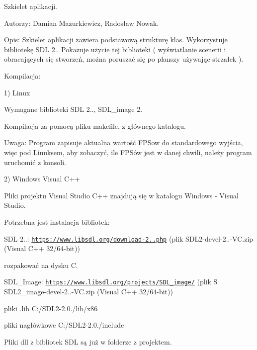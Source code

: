 Szkielet aplikacji.

Autorzy\+: Damian Mazurkiewicz, Radosław Nowak.

Opis\+: Szkielet aplikacji zawiera podstawową strukturę klas. Wykorzystuje bibliotekę S\+D\+L 2.. Pokazuje użycie tej biblioteki ( wyświatlanie scenerii i obracających się stworzeń, można poruszać się po planszy używając strzałek ).

Kompilacja\+:

1) Linux

Wymagane biblioteki S\+D\+L 2.., S\+D\+L\+\_\+image 2.

Kompilacja za pomocą pliku makefile, z głównego katalogu.

Uwaga\+: Program zapisuje aktualna wartość F\+P\+Sow do standardowego wyjścia, więc pod Linuksem, aby zobaczyć, ile F\+P\+Sów jest w danej chwili, należy program uruchomić z konsoli.

2) Windows Visual C++

Pliki projektu Visual Studio C++ znajdują się w katalogu Windows -\/ Visual Studio.

Potrzebna jest instalacja bibliotek\+:

S\+D\+L 2..\+: \href{https://www.libsdl.org/download-2.0.php}{\tt https\+://www.\+libsdl.\+org/download-\/2..\+php} (plik S\+D\+L2-\/devel-\/2..-\/\+V\+C.\+zip (Visual C++ 32/64-\/bit))
\begin{DoxyItemize}
\item rozpakować na dysku C.
\end{DoxyItemize}

S\+D\+L\+\_\+\+Image\+: \href{https://www.libsdl.org/projects/SDL_image/}{\tt https\+://www.\+libsdl.\+org/projects/\+S\+D\+L\+\_\+image/} (plik S S\+D\+L2\+\_\+image-\/devel-\/2..-\/\+V\+C.\+zip (Visual C++ 32/64-\/bit))
\begin{DoxyItemize}
\item pliki .lib C\+:/\+S\+D\+L2-\/2.0./lib/x86
\item pliki nagłówkowe C\+:/\+S\+D\+L2-\/2.0./include
\end{DoxyItemize}

Pliki dll z bibliotek S\+D\+L są już w folderze z projektem. 